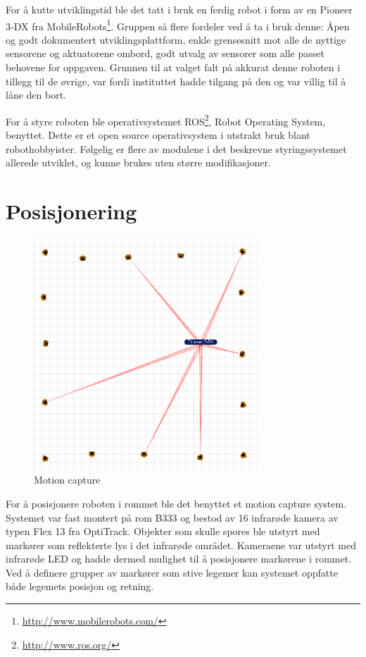 For å kutte utviklingstid ble det tatt i bruk en ferdig robot i form av en Pioneer 3-DX fra MobileRobots\footnote{\url{http://www.mobilerobots.com/}}. Gruppen så flere fordeler ved å ta i bruk denne: Åpen og godt dokumentert
utviklingsplattform, enkle grensesnitt mot alle de nyttige sensorene og aktuatorene ombord, godt utvalg av sensorer som
alle passet behovene for oppgaven. Grunnen til at valget falt på akkurat denne roboten i tillegg til de øvrige, var
fordi instituttet hadde tilgang på den og var villig til å låne den bort.

For å styre roboten ble operativsystemet ROS\footnote{\url{http://www.ros.org/}}, Robot Operating System, benyttet.
Dette er et open source operativsystem i utstrakt bruk blant robothobbyister. Følgelig er flere av modulene i det
beskrevne styringssystemet allerede utviklet, og kunne brukes uten større modifikasjoner.

\section{Posisjonering}

\begin{figure}[!ht]
  \centering
  \includegraphics[width=0.75\textwidth]{gfx/mocap.png}
  \caption{Motion capture}
\end{figure}

For å posisjonere roboten i rommet ble det benyttet et motion capture system. Systemet var fast montert på rom
B333 og bestod av 16 infrarøde kamera av typen Flex 13 fra OptiTrack. Objekter som skulle spores ble utstyrt med markører som
reflekterte lys i det infrarøde området. Kameraene var utstyrt med infrarøde LED og hadde dermed mulighet til å posisjonere markørene i rommet. Ved å definere grupper av markører som stive
legemer kan systemet oppfatte både legemets posisjon og retning.

